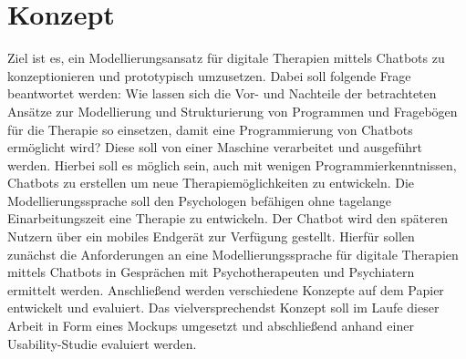 \section{Konzept}
\label{ch:Konzept}
Ziel ist es, ein Modellierungsansatz für digitale Therapien mittels Chatbots zu konzeptionieren und prototypisch umzusetzen. Dabei soll folgende Frage beantwortet werden: Wie lassen sich die Vor- und Nachteile der betrachteten Ansätze zur Modellierung und Strukturierung von Programmen und Fragebögen für die Therapie so einsetzen, damit eine Programmierung von Chatbots ermöglicht wird? Diese soll von einer Maschine verarbeitet und ausgeführt werden. Hierbei soll es möglich sein, auch mit wenigen Programmierkenntnissen, Chatbots zu erstellen um neue Therapiemöglichkeiten zu entwickeln. Die Modellierungssprache soll den Psychologen befähigen ohne tagelange Einarbeitungszeit eine Therapie zu entwickeln. %
Der Chatbot wird den späteren Nutzern über ein mobiles Endgerät zur Verfügung gestellt. Hierfür sollen zunächst die Anforderungen an eine Modellierungssprache für digitale Therapien mittels Chatbots in Gesprächen mit Psychotherapeuten und Psychiatern ermittelt werden. Anschließend werden verschiedene Konzepte auf dem Papier entwickelt und evaluiert. Das vielversprechendst Konzept soll im Laufe dieser Arbeit in Form eines Mockups umgesetzt und abschließend anhand einer Usability-Studie evaluiert werden. 